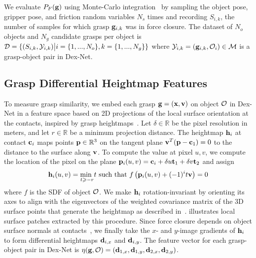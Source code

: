 We evaluate $P_F(\mathbf{g})$ using Monte-Carlo integration~\cite{kehoe2012toward} by sampling the object pose, gripper pose, and friction random variables $N_s$ times and recording $S_{i,k}$, the number of samples for which grasp $\mathbf{g}_{i,k}$ was in force closure.
The dataset of $N_o$ objects and $N_g$ candidate grasps per object is $\mathcal{D} = \{ (S_{i, k}, \mathcal{Y}_{i, k}) \big| i = \{1, ..., N_o\}, k = \{1, ..., N_g\} \}$ where $\mathcal{Y}_{i,k} = (\mathbf{g}_{i, k}, \mathcal{O}_i) \in \mathcal{M}$ is a grasp-object pair in Dex-Net.



\subsection{Grasp Differential Heightmap Features}
To measure grasp similarity, we embed each grasp $\mathbf{g} = (\mathbf{x} ,\mathbf{v})$ on object $\mathcal{O}$ in Dex-Net in a feature space based on 2D projections of the local surface orientation at the contacts, inspired by grasp heightmaps~\cite{herzog2014learning, kappler2015leveraging}.
Let $\delta \in \mathbb{R}$ be the pixel resolution in meters, and let $r \in \mathbb{R}$ be a minimum projection distance.
The heightmap $\mathbf{h}_{i}$ at contact $\mathbf{c}_i$ maps points $\mathbf{p} \in \mathbb{R}^3$ on the tangent plane $\mathbf{v}^T(\mathbf{p} - \mathbf{c}_1) = 0$ to the distance to the surface along $\mathbf{v}$.
To compute the value at pixel $u,v$, we compute the location of the pixel on the plane $\mathbf{p}_i(u,v) = \mathbf{c}_i + \delta u \mathbf{t}_1 + \delta v \mathbf{t}_2$ and assign
\begin{align*}
	\mathbf{h}_i(u,v) = \underset{t \geqslant -r}{\text{min }} t \text{ such that } f\left( \mathbf{p}_i(u,v) + (-1)^{i} t \mathbf{v} \right) = 0
\end{align*}
\noindent where $f$ is the SDF of object $\mathcal{O}$. 
We make $\mathbf{h}_i$ rotation-invariant by orienting its axes to align with the eigenvectors of the weighted covariance matrix of the 3D surface points that generate the heightmap as described in~\cite{salti2014shot}.
 illustrates local surface patches extracted by this procedure.
Since force closure depends on object surface normals at contacts~\cite{pokorny2013c}, we finally take the $x$- and $y$-image gradients of $\mathbf{h}_i$ to form differential heightmaps $\mathbf{d}_{i,x}$ and $\mathbf{d}_{i,y}$.
The feature vector for each grasp-object pair  in Dex-Net is $\eta(\mathbf{g}, \mathcal{O}) = (\mathbf{d}_{1,x}, \mathbf{d}_{1,y}, \mathbf{d}_{2,x}, \mathbf{d}_{2,y})$.

